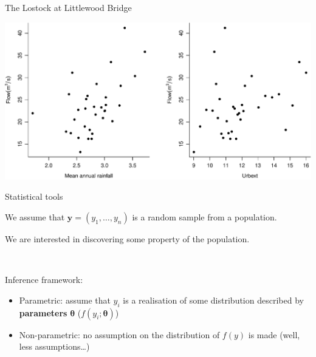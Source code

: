 \documentclass[
  10pt,
  ignorenonframetext,
  compress]{beamer}
\providecommand{\tightlist}{%
  \setlength{\itemsep}{0pt}\setlength{\parskip}{0pt}}
\begin{document}
\begin{frame}{The Lostock at Littlewood Bridge}
\protect\hypertarget{the-lostock-at-littlewood-bridge-1}{}

\includegraphics{ProsdocimiPerugia_files/figure-beamer/LostockDataExpl-1.pdf}

\end{frame}

\begin{frame}{Statistical tools}
\protect\hypertarget{statistical-tools}{}

We assume that \(\boldsymbol{y} = (y_1, \ldots, y_n)\) is a random
sample from a population.

We are interested in discovering some property of the population.

\pause

~

Inference framework:

\begin{itemize}
\tightlist
\item
  Parametric: assume that \(y_i\) is a realisation of some distribution
  described by \textbf{parameters} \(\boldsymbol{\theta}\)
  (\(f(y_i; \boldsymbol{\theta})\))
\item
  Non-parametric: no assumption on the distribution of \(f(y)\) is made
  (well, less assumptions\ldots)
\end{itemize}

\end{frame}
\end{document}
